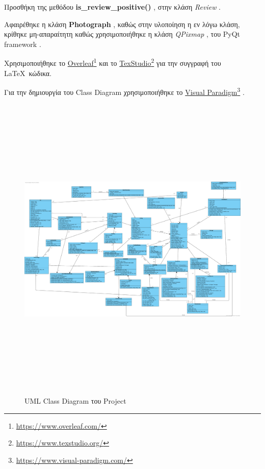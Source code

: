 \documentclass{../ol-softwaremanual}
\newcommand{\doclink}[2]{\href{#1}{#2}\footnote{\url{#1}}}
\begin{document}
	Προσθήκη της μεθόδου \en \textbf{is\_review\_positive()} \gr, στην κλάση \en \textit{Review} \gr. \break
	
	Αφαιρέθηκε η κλάση \en \textbf{Photograph} \gr, καθώς στην υλοποίηση η εν λόγω κλάση, κρίθηκε μη-απαραίτητη καθώς χρησιμοποιήθηκε η κλάση \en \textit{QPixmap} \gr, του \en PyQt framework \gr.
	
	
	\vspace{20pt}
	
	\newpage 
	
	
	
	\vspace{20pt}
	\flushleft
	Χρησιμοποιήθηκε το \en \doclink{https://www.overleaf.com/}{Overleaf} \gr και το \en \doclink{https://www.texstudio.org/}{TexStudio} \gr για την συγγραφή του \LaTeX\ κώδικα. \break
	
	Για την δημιουργία του \en Class Diagram \gr χρησιμοποιήθηκε το \en \doclink{https://www.visual-paradigm.com/}{Visual Paradigm} \gr .
	
	\newpage
	
	
	\begin{figure}[htbp!]		
		\includegraphics[width=\textwidth+3.4cm, height=15cm]{img/class_diagram_v0.2.png}
		\caption{\en UML Class Diagram \gr του \en Project \gr}
	\end{figure}
	
\end{document}
